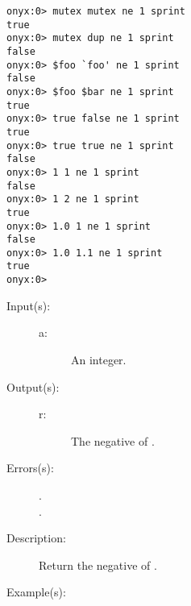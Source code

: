 \begin{description}
\begin{description}
\begin{verbatim}
onyx:0> mutex mutex ne 1 sprint
true
onyx:0> mutex dup ne 1 sprint
false
onyx:0> $foo `foo' ne 1 sprint
false
onyx:0> $foo $bar ne 1 sprint
true
onyx:0> true false ne 1 sprint
true
onyx:0> true true ne 1 sprint
false
onyx:0> 1 1 ne 1 sprint
false
onyx:0> 1 2 ne 1 sprint
true
onyx:0> 1.0 1 ne 1 sprint
false
onyx:0> 1.0 1.1 ne 1 sprint
true
onyx:0>
		\end{verbatim}
	\end{description}
\label{systemdict:neg}
\item[{\onyxop{a}{neg}{r}}: ]
	\begin{description}\item[]
	\item[Input(s): ]
		\begin{description}\item[]
		\item[a: ]
			An integer.
		\end{description}
	\item[Output(s): ]
		\begin{description}\item[]
		\item[r: ]
			The negative of .
		\end{description}
	\item[Errors(s): ]
		\begin{description}\item[]
		\item[.]
		\item[.]
		\end{description}
	\item[Description: ]
		Return the negative of .
	\item[Example(s): ]\begin{verbatim}


\end{verbatim}
\end{description}
\end{description}
